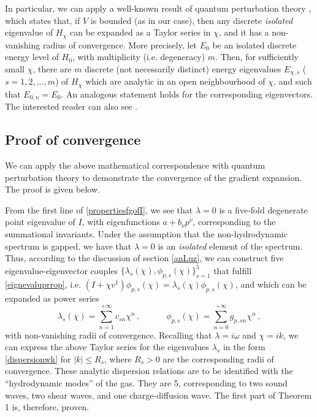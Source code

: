 \documentclass[a4paper, amsfonts, amssymb, amsmath, reprint, showkeys, nofootinbib, twoside, onecolumn,notitlepage]{revtex4-2}
\newcommand{\spc}{\quad \quad \quad}
\theoremstyle{definition}
\theoremstyle{theorem}
\theoremstyle{corollary}
\begin{document}
In particular, we can apply a well-known result of quantum perturbation theory \cite{KatoAmazing1949}, which states that, if $V$ is bounded (as in our case), then any discrete \textit{isolated} eigenvalue of $H_\chi$ can be expanded as a Taylor series in $\chi$, and it has a non-vanishing radius of convergence. More precisely, let $E_0$ be an isolated discrete energy level of $H_0$, with multiplicity (i.e. degeneracy) $m$. Then, for sufficiently small $\chi$, there are $m$ discrete (not necessarily distinct) energy eigenvalues $E_{\chi,s}$ ($s=1,2,...,m$) of $H_\chi$ which are analytic in an open neighbourhood of $\chi$, and such that $E_{0,n} = E_0$. An analogous statement holds for the corresponding eigenvectors. The interested reader can also see \cite[\S 136]{RieszNagybook}.

\subsection{Proof of convergence}\label{backhere}

We can apply the above mathematical correspondence with quantum perturbation theory to demonstrate the convergence of the gradient expansion. The proof is given below.

From the first line of \eqref{propertiesfgofI}, we see that $\lambda=0$ is a five-fold degenerate point eigenvalue of $I$, with eigenfunctions $a+b_\nu p^\nu$, corresponding to the summational invariants. Under the assumption that the non-hydrodynamic spectrum is gapped, we have that $\lambda=0$ is an \textit{isolated} element of the spectrum. Thus, according to the discussion of section \ref{anLuz}, we can construct five eigenvalue-eigenvector couples $\{\lambda_s(\chi),\phi_{p,s}(\chi)\}_{s=1}^5$ that fulfill \eqref{eignevaluprrop}, i.e. $(I+\chi v^1)\phi_{p,s}(\chi)=\lambda_s(\chi) \phi_{p,s}(\chi)$, and which can be expanded as power series
\begin{equation}\label{gringo!!}
\lambda_s(\chi)=\sum_{n=1}^{+\infty} c_{sn} \chi^n \, , \spc \phi_{p,s}(\chi)=\sum_{n=0}^{+\infty} g_{p,sn} \chi^n \, ,
\end{equation}
with non-vanishing radii of convergence. Recalling that $\lambda=i\omega$ and $\chi=ik$, we can express the above Taylor series for the eigenvalues $\lambda_s$ in the form \eqref{dispersionwk} for $|k|\leq R_s$,
where $R_s>0$ are the corresponding radii of convergence. These analytic dispersion relations are to be identified with the ``hydrodynamic modes'' of the gas. They are 5, corresponding to two sound waves, two shear waves, and one charge-diffusion wave. The first part of Theorem 1 is, therefore, proven.
\end{document}
